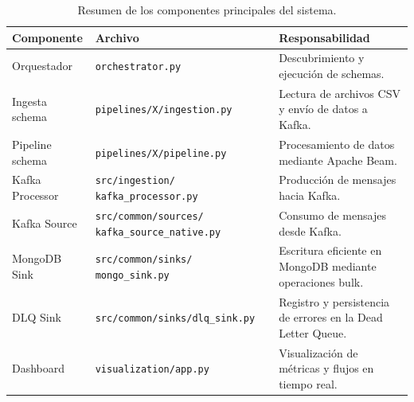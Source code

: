\documentclass[12pt,a4paper]{article}
\begin{document}
\begin{table}[h!]
    \centering
    \small
    \renewcommand{\arraystretch}{1.2}
    \begin{tabular}{|l|p{5.5cm}|p{6cm}|}
        \hline
        \textbf{Componente} & \textbf{Archivo} & \textbf{Responsabilidad} \\ \hline
        Orquestador
        & \texttt{orchestrator.py}
        & Descubrimiento y ejecución de schemas. \\ \hline

        Ingesta schema
        & \texttt{pipelines/X/ingestion.py}
        & Lectura de archivos CSV y envío de datos a Kafka. \\ \hline

        Pipeline schema
        & \texttt{pipelines/X/pipeline.py}
        & Procesamiento de datos mediante Apache Beam. \\ \hline

        Kafka Processor
        & \texttt{src/ingestion/ kafka\_processor.py}
        & Producción de mensajes hacia Kafka. \\ \hline

        Kafka Source
        & \texttt{src/common/sources/ kafka\_source\_native.py}
        & Consumo de mensajes desde Kafka. \\ \hline

        MongoDB Sink
        & \texttt{src/common/sinks/ mongo\_sink.py}
        & Escritura eficiente en MongoDB mediante operaciones bulk. \\ \hline

        DLQ Sink
        & \texttt{src/common/sinks/dlq\_sink.py}
        & Registro y persistencia de errores en la Dead Letter Queue. \\ \hline

        Dashboard
        & \texttt{visualization/app.py}
        & Visualización de métricas y flujos en tiempo real. \\ \hline
    \end{tabular}
    \caption{Resumen de los componentes principales del sistema.}
    \label{tab:componentes_sistema}
\end{table}
\end{document}
